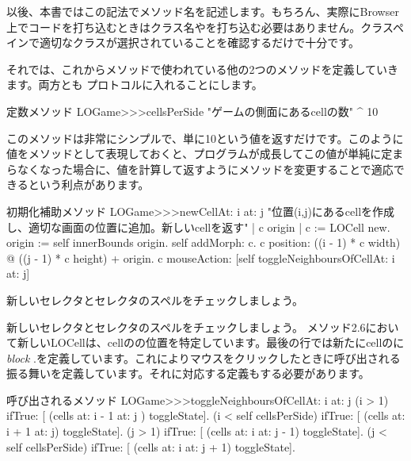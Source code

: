 \documentclass[a4paper,10pt,twoside]{book}
\begin{document}

以後、本書ではこの記法でメソッド名を記述します。もちろん、実際にBrowser上でコードを打ち込むときはクラス名や\ct{>>>}を打ち込む必要はありません。クラスペインで適切なクラスが選択されていることを確認するだけで十分です。

それでは、これからメソッドで使われている他の2つのメソッドを定義していきます。両方とも プロトコルに入れることにします。

\begin{method}[sbegamecellsperside]{定数メソッド}
LOGame>>>cellsPerSide
   "ゲームの側面にあるcellの数"
   ^ 10
\end{method}

このメソッドは非常にシンプルで、単に10という値を返すだけです。このように値をメソッドとして表現しておくと、プログラムが成長してこの値が単純に定まらなくなった場合に、値を計算して返すようにメソッドを変更することで適応できるという利点があります。

\begin{method}[newCellAt:at:]{初期化補助メソッド}
LOGame>>>newCellAt: i at: j
   "位置(i,j)にあるcellを作成し、適切な画面の位置に追加。新しいcellを返す"
   | c origin |
   c := LOCell new.
   origin := self innerBounds origin.
   self addMorph: c.
   c position: ((i - 1) * c width) @ ((j - 1) * c height) + origin.
   c mouseAction: [self toggleNeighboursOfCellAt: i at: j]
\end{method}


新しいセレクタとセレクタのスペルをチェックしましょう。

 新しいセレクタとセレクタのスペルをチェックしましょう。
メソッド2.6において新しいLOCellは、cellのの位置を特定しています。最後の行では新たにcellのに\emph{block}
\mbox{.}を定義しています。これによりマウスをクリックしたときに呼び出される振る舞いを定義しています。それに対応する定義もする必要があります。

\begin{method}[toggleNeighboursOfCellAt:at:]{呼び出されるメソッド}
LOGame>>>toggleNeighboursOfCellAt: i at: j
   (i > 1) ifTrue: [ (cells at: i - 1 at: j ) toggleState].
   (i < self cellsPerSide) ifTrue: [ (cells at: i + 1 at: j) toggleState].
   (j > 1) ifTrue: [ (cells at: i  at: j - 1) toggleState].
   (j < self cellsPerSide) ifTrue: [ (cells at: i at: j + 1) toggleState].
\end{method}
\end{document}
